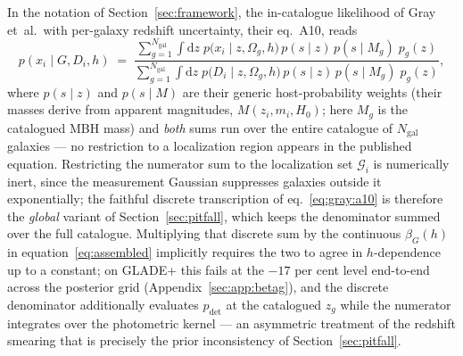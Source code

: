 In the notation of Section~\ref{sec:framework}, the in-catalogue
likelihood of Gray et~al.\ with per-galaxy redshift uncertainty, their
eq.~A10, reads
\begin{equation}
  p(x_i \mid G, D_i, h)
  \;=\;
  \frac{\displaystyle\sum_{g=1}^{N_\mathrm{gal}} \int \mathrm{d}z\;
        p\big(x_i \mid z, \Omega_g, h\big)\, p(s \mid z)\,
        p(s \mid M_g)\; p_g(z)}
       {\displaystyle\sum_{g=1}^{N_\mathrm{gal}} \int \mathrm{d}z\;
        p\big(D_i \mid z, \Omega_g, h\big)\, p(s \mid z)\,
        p(s \mid M_g)\; p_g(z)},
  \label{eq:gray:a10}
\end{equation}
where $p(s\mid z)$ and $p(s\mid M)$ are their generic host-probability
weights (their masses derive from apparent magnitudes,
$M(z_i, m_i, H_0)$; here $M_g$ is the catalogued MBH mass) and
\emph{both} sums run over the entire catalogue of $N_\mathrm{gal}$
galaxies --- no restriction to a localization region appears in the
published equation.  Restricting the numerator sum to the
localization set $\mathcal{G}_i$ is numerically inert, since the measurement Gaussian
suppresses galaxies outside it exponentially; the faithful discrete
transcription of eq.~\eqref{eq:gray:a10} is therefore the
\emph{global} variant of Section~\ref{sec:pitfall}, which keeps the
denominator summed over the full catalogue.  Multiplying that discrete
sum by the continuous $\beta_G(h)$ in equation~\eqref{eq:assembled}
implicitly requires the two to agree in $h$-dependence up to a
constant; on GLADE+ this fails at the $-17$ per cent level end-to-end
across the posterior grid (Appendix~\ref{sec:app:betag}),
and the discrete denominator additionally evaluates $p_\mathrm{det}$
at the catalogued $z_g$ while the numerator integrates over the
photometric kernel --- an asymmetric treatment of the redshift
smearing that is precisely the prior inconsistency of
Section~\ref{sec:pitfall}.

